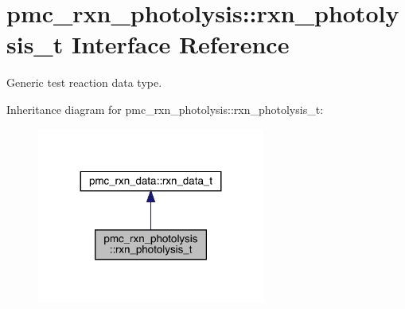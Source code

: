 \hypertarget{structpmc__rxn__photolysis_1_1rxn__photolysis__t}{}\section{pmc\+\_\+rxn\+\_\+photolysis\+:\+:rxn\+\_\+photolysis\+\_\+t Interface Reference}
\label{structpmc__rxn__photolysis_1_1rxn__photolysis__t}


Generic test reaction data type.  




Inheritance diagram for pmc\+\_\+rxn\+\_\+photolysis\+:\+:rxn\+\_\+photolysis\+\_\+t\+:\nopagebreak
\begin{figure}[H]
\begin{center}
\leavevmode
\includegraphics[width=212pt]{structpmc__rxn__photolysis_1_1rxn__photolysis__t__inherit__graph}
\end{center}
\end{figure}
